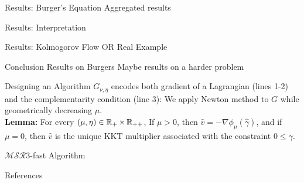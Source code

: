\documentclass[8pt]{beamer}
\newcommand{\ouralgo}{\ensuremath{\mathcal{MSR}3}}
\begin{document}
\begin{frame}{Results: Burger's Equation}
	Aggregated results
\end{frame}

\begin{frame}{Results: Interpretation}
	
\end{frame}

\begin{frame}{Results: Kolmogorov Flow OR Real Example}
\end{frame}

\begin{frame}{Conclusion}
	Results on Burgers
	Maybe results on a harder problem
\end{frame}

\appendix
\begin{frame}{Designing an Algorithm}
	$G_{\nu,\eta}$ encodes both gradient of a Lagrangian (lines 1-2) and the complementarity condition (line 3):
	We apply Newton method to $G$ while geometrically decreasing $\mu$. \\
\textbf{Lemma:} For every $(\mu,\eta) \in \operatorname{\mathbb{R}}_+\times\operatorname{\mathbb{R}}_{++}$,
If $\mu > 0$, then $\hat{v} = -\nabla\phi_\mu(\hat{\gamma})$, and if $\mu = 0$, then $\hat{v}$ is the unique KKT multiplier associated with the constraint $0 \leq \gamma$.
\end{frame}

\begin{frame}{$\ouralgo$-fast Algorithm}

\end{frame}

\begin{frame}{References}
\printbibliography
\end{frame}
\end{document}
